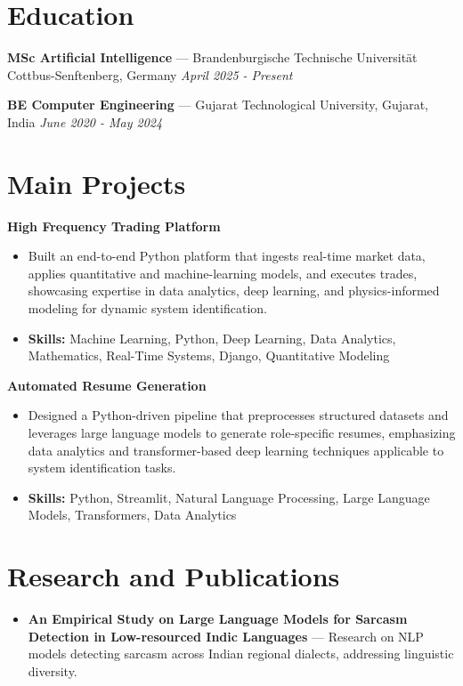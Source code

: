 \documentclass[a4paper,10pt]{article}
\begin{document}
\section*{Education}
\textbf{MSc Artificial Intelligence} — Brandenburgische Technische Universität Cottbus-Senftenberg, Germany \hfill \textit{April 2025 - Present}\par
\vspace{1.5pt}
\textbf{BE Computer Engineering} — Gujarat Technological University, Gujarat, India \hfill \textit{June 2020 - May 2024}\par

\section*{Main Projects}
\textbf{High Frequency Trading Platform}\par
\vspace{1pt}
\begin{itemize}
  \item Built an end-to-end Python platform that ingests real-time market data, applies quantitative and machine-learning models, and executes trades, showcasing expertise in data analytics, deep learning, and physics-informed modeling for dynamic system identification.
  \item \textbf{Skills:} Machine Learning, Python, Deep Learning, Data Analytics, Mathematics, Real-Time Systems, Django, Quantitative Modeling
\end{itemize}
\vspace{3pt}
\textbf{Automated Resume Generation}\par
\vspace{1pt}
\begin{itemize}
  \item Designed a Python-driven pipeline that preprocesses structured datasets and leverages large language models to generate role-specific resumes, emphasizing data analytics and transformer-based deep learning techniques applicable to system identification tasks.
  \item \textbf{Skills:} Python, Streamlit, Natural Language Processing, Large Language Models, Transformers, Data Analytics
\end{itemize}

\section*{Research and Publications}
\begin{itemize}
\item \textbf{An Empirical Study on Large Language Models for Sarcasm Detection in Low-resourced Indic Languages} — Research on NLP models detecting sarcasm across Indian regional dialects, addressing linguistic diversity.
\end{itemize}
\end{document}
